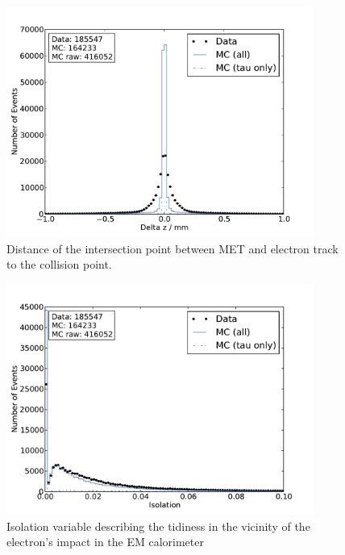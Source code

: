 \documentclass[
	paper=A4,
	parskip=full,
	chapterprefix=true,
	11pt,
	headings=normal,
	bibliography=totoc,
	listof=totoc,
	titlepage=on,
]{scrreprt}
\begin{document}
\begin{figure}[htbp]
	\centering
	\includegraphics[width=0.9\textwidth]{nocuts/delta_z}
	\caption{Distance of the intersection point between MET and electron track to the collision point.}
	\label{fig:no_cuts_dz}
\end{figure}
\begin{figure}[htbp]
	\centering
	\includegraphics[width=0.9\textwidth]{nocuts/el_iso}
	\caption{Isolation variable describing the tidiness in the vicinity of the electron's impact in the EM calorimeter}
	\label{fig:no_cuts_iso}
\end{figure}
\end{document}
